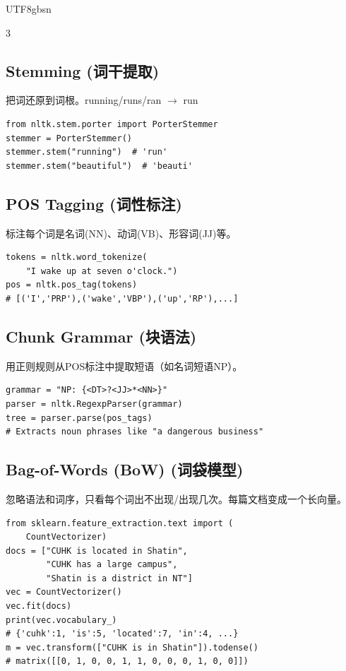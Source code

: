 \documentclass[9pt,landscape,a4paper]{article}
\newcommand{\zhint}[1]{{\scriptsize\color{gray!70!black}#1}}
\begin{document}
\begin{CJK}{UTF8}{gbsn}
\begin{multicols}{3}
\subsection{Stemming \zhint{(词干提取)}}
\zhint{把词还原到词根。running/runs/ran $\to$ run}

\begin{lstlisting}
from nltk.stem.porter import PorterStemmer
stemmer = PorterStemmer()
stemmer.stem("running")  # 'run'
stemmer.stem("beautiful")  # 'beauti'
\end{lstlisting}

\subsection{POS Tagging \zhint{(词性标注)}}
\zhint{标注每个词是名词(NN)、动词(VB)、形容词(JJ)等。}

\begin{lstlisting}
tokens = nltk.word_tokenize(
    "I wake up at seven o'clock.")
pos = nltk.pos_tag(tokens)
# [('I','PRP'),('wake','VBP'),('up','RP'),...]
\end{lstlisting}

\subsection{Chunk Grammar \zhint{(块语法)}}
\zhint{用正则规则从POS标注中提取短语（如名词短语NP）。}

\begin{lstlisting}
grammar = "NP: {<DT>?<JJ>*<NN>}"
parser = nltk.RegexpParser(grammar)
tree = parser.parse(pos_tags)
# Extracts noun phrases like "a dangerous business"
\end{lstlisting}

\subsection{Bag-of-Words (BoW) \zhint{(词袋模型)}}
\zhint{忽略语法和词序，只看每个词出不出现/出现几次。每篇文档变成一个长向量。}

\begin{lstlisting}
from sklearn.feature_extraction.text import (
    CountVectorizer)
docs = ["CUHK is located in Shatin",
        "CUHK has a large campus",
        "Shatin is a district in NT"]
vec = CountVectorizer()
vec.fit(docs)
print(vec.vocabulary_)
# {'cuhk':1, 'is':5, 'located':7, 'in':4, ...}
m = vec.transform(["CUHK is in Shatin"]).todense()
# matrix([[0, 1, 0, 0, 1, 1, 0, 0, 0, 1, 0, 0]])
\end{lstlisting}


\end{multicols}
\end{CJK}
\end{document}
